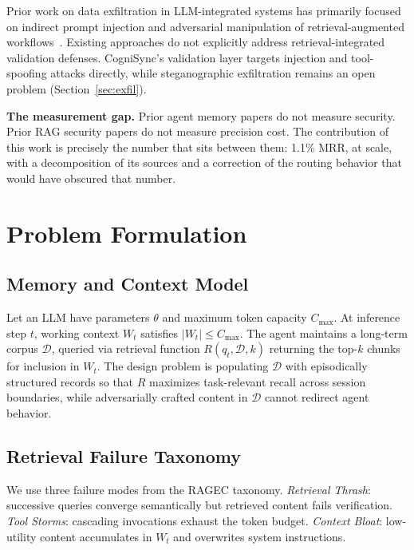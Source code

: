 \documentclass[sigconf]{acmart}
\begin{document}
Prior work on data exfiltration in LLM-integrated systems has primarily
focused on indirect prompt injection and adversarial manipulation of
retrieval-augmented workflows~\cite{greshake2023indirect}. Existing
approaches do not explicitly address retrieval-integrated validation
defenses. CogniSync's validation layer targets injection and
tool-spoofing attacks directly, while steganographic exfiltration
remains an open problem (Section~\ref{sec:exfil}).

\textbf{The measurement gap.} Prior agent memory papers do not measure
security. Prior RAG security papers do not measure precision cost. The
contribution of this work is precisely the number that sits between them:
1.1\% MRR, at scale, with a decomposition of its sources and a correction
of the routing behavior that would have obscured that number.

\section{Problem Formulation}

\subsection{Memory and Context Model}

Let an LLM have parameters $\theta$ and maximum token capacity
$C_{\max}$. At inference step $t$, working context $W_t$ satisfies
$\lvert W_t\rvert \leq C_{\max}$. The agent maintains a long-term corpus
$\mathcal{D}$, queried via retrieval function $R(q_t,\mathcal{D},k)$
returning the top-$k$ chunks for inclusion in $W_t$. The design problem
is populating $\mathcal{D}$ with episodically structured records so that
$R$ maximizes task-relevant recall across session boundaries, while
adversarially crafted content in $\mathcal{D}$ cannot redirect agent
behavior.

\subsection{Retrieval Failure Taxonomy}

We use three failure modes from the RAGEC taxonomy. \emph{Retrieval
Thrash}: successive queries converge semantically but retrieved content
fails verification. \emph{Tool Storms}: cascading invocations exhaust the
token budget. \emph{Context Bloat}: low-utility content accumulates in
$W_t$ and overwrites system instructions.
\end{document}
